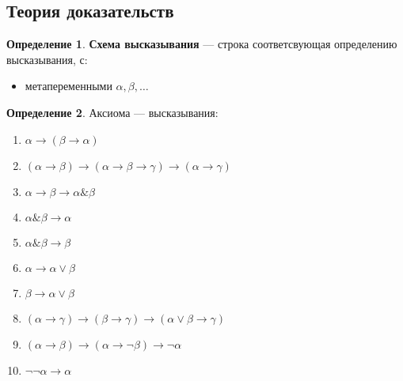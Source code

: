 \documentclass[english]{article}
\theoremstyle{plain}
\theoremstyle{remark}
\theoremstyle{definition}
\newtheorem*{definition}{Определение}
\begin{document}
\subsection{Теория доказательств}
\label{sec:orgb8d45e6}
\begin{definition}
\textbf{Схема высказывания} --- строка соответсвующая определению высказывания, с:
\begin{itemize}
\item метапеременными \(\alpha, \beta, \dots\)
\end{itemize}
\end{definition}
\begin{definition}
Аксиома --- высказывания:
\begin{enumerate}
\item \(\alpha \to (\beta \to \alpha)\)
\item \((\alpha \to \beta) \to (\alpha \to \beta \to \gamma) \to (\alpha \to \gamma)\)
\item \(\alpha \to \beta \to \alpha \& \beta\)
\item \(\alpha \& \beta \to \alpha\)
\item \(\alpha \& \beta \to \beta\)
\item \(\alpha \to \alpha \vee \beta\)
\item \(\beta \to \alpha \vee \beta\)
\item \((\alpha \to \gamma) \to (\beta \to \gamma) \to (\alpha \vee \beta \to \gamma)\)
\item \((\alpha \to \beta) \to (\alpha \to \neg \beta) \to \neg \alpha\)
\item \(\neg\neg \alpha \to \alpha\)
\end{enumerate}
\end{definition}
\end{document}
